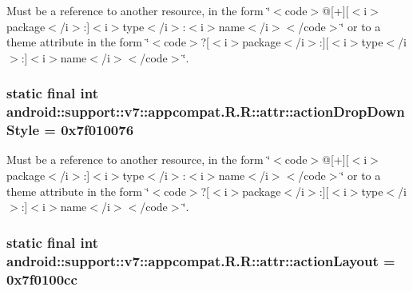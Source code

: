 Must be a reference to another resource, in the form \char`\"{}$<$code$>$@\mbox{[}+\mbox{]}\mbox{[}$<$i$>$package$<$/i$>$:\mbox{]}$<$i$>$type$<$/i$>$:$<$i$>$name$<$/i$>$$<$/code$>$\char`\"{} or to a theme attribute in the form \char`\"{}$<$code$>$?\mbox{[}$<$i$>$package$<$/i$>$:\mbox{]}\mbox{[}$<$i$>$type$<$/i$>$:\mbox{]}$<$i$>$name$<$/i$>$$<$/code$>$\char`\"{}. \hypertarget{classandroid_1_1support_1_1v7_1_1appcompat_1_1_r_1_1attr_8eba244b7f46ab213ea67d8a91b5ecc3}{
\subsubsection[{actionDropDownStyle}]{\setlength{\rightskip}{0pt plus 5cm}static final int android::support::v7::appcompat.R.R::attr::actionDropDownStyle = 0x7f010076}}
\label{classandroid_1_1support_1_1v7_1_1appcompat_1_1_r_1_1attr_8eba244b7f46ab213ea67d8a91b5ecc3}


Must be a reference to another resource, in the form \char`\"{}$<$code$>$@\mbox{[}+\mbox{]}\mbox{[}$<$i$>$package$<$/i$>$:\mbox{]}$<$i$>$type$<$/i$>$:$<$i$>$name$<$/i$>$$<$/code$>$\char`\"{} or to a theme attribute in the form \char`\"{}$<$code$>$?\mbox{[}$<$i$>$package$<$/i$>$:\mbox{]}\mbox{[}$<$i$>$type$<$/i$>$:\mbox{]}$<$i$>$name$<$/i$>$$<$/code$>$\char`\"{}. \hypertarget{classandroid_1_1support_1_1v7_1_1appcompat_1_1_r_1_1attr_5adbe4e56bac0ca48bfd2016432468e5}{
\subsubsection[{actionLayout}]{\setlength{\rightskip}{0pt plus 5cm}static final int android::support::v7::appcompat.R.R::attr::actionLayout = 0x7f0100cc}}
\label{classandroid_1_1support_1_1v7_1_1appcompat_1_1_r_1_1attr_5adbe4e56bac0ca48bfd2016432468e5}


